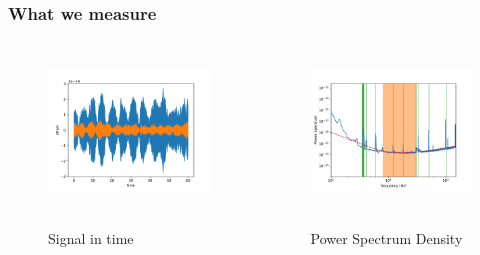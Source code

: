 \begin{frame}
	\frametitle{What we measure}
    \begin{columns}[b]
			\centering
			\begin{figure}
				\includegraphics[width=\textwidth]{h1} \
				\caption{Signal in time}
			\end{figure}
			\centering
			\begin{figure}
				\includegraphics[width=\textwidth]{psd} \
				\caption{Power Spectrum Density}
			\end{figure}

\end{columns}
\end{frame}
